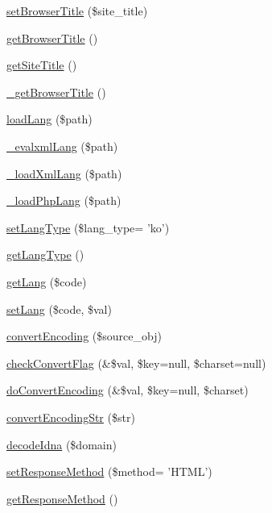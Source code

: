 \begin{DoxyCompactItemize}
\hyperlink{classContext_aab07bc95a7a855c4d9608b4ed615807f}{set\-Browser\-Title} (\$site\-\_\-title)
\item 
\hyperlink{classContext_a19f432349a41af2ed36b2cd5e6ba96a5}{get\-Browser\-Title} ()
\item 
\hyperlink{classContext_a0ee79330d3ee12c811cd784e24a7b017}{get\-Site\-Title} ()
\item 
\hyperlink{classContext_ab8f518a596abcbbd70b20dd46442ae0a}{\-\_\-get\-Browser\-Title} ()
\item 
\hyperlink{classContext_a7b22a741ff804e5cdaafd952273bd70c}{load\-Lang} (\$path)
\item 
\hyperlink{classContext_a45bd19b6edf9e66582842a3f6e50fa4b}{\-\_\-evalxml\-Lang} (\$path)
\item 
\hyperlink{classContext_af3ba6aaa8fa5f6c758b7716ec7135ab3}{\-\_\-load\-Xml\-Lang} (\$path)
\item 
\hyperlink{classContext_a3ad6fc7782e7234fe77357da28218310}{\-\_\-load\-Php\-Lang} (\$path)
\item 
\hyperlink{classContext_ad70a3a0db09c75a9eb20e8f5f1df305f}{set\-Lang\-Type} (\$lang\-\_\-type= 'ko')
\item 
\hyperlink{classContext_ae75d6f4064d09e48d0d76614b6997e29}{get\-Lang\-Type} ()
\item 
\hyperlink{classContext_a9af9269b04542f7462d27a63226e0ff3}{get\-Lang} (\$code)
\item 
\hyperlink{classContext_a3615e0bc64da445f6165e97785c7d94c}{set\-Lang} (\$code, \$val)
\item 
\hyperlink{classContext_a9ef4f41a9ae7108ea7560162399c77a8}{convert\-Encoding} (\$source\-\_\-obj)
\item 
\hyperlink{classContext_ac2bf2f97195aae6b2cd6ba559bbcb18f}{check\-Convert\-Flag} (\&\$val, \$key=null, \$charset=null)
\item 
\hyperlink{classContext_ade825b985221f5bef69919e30e9ed248}{do\-Convert\-Encoding} (\&\$val, \$key=null, \$charset)
\item 
\hyperlink{classContext_a0464dcbadfd67f62265fac90546d3bf8}{convert\-Encoding\-Str} (\$str)
\item 
\hyperlink{classContext_a122117b49e4926d40dc6fc76297792bc}{decode\-Idna} (\$domain)
\item 
\hyperlink{classContext_afc58a19e296dfc70a95648f35bb0f3a9}{set\-Response\-Method} (\$method= 'H\-T\-M\-L')
\item 
\hyperlink{classContext_a1d02a15209360034cd719d8b08cb5061}{get\-Response\-Method} ()
\item 

\end{DoxyCompactItemize}
